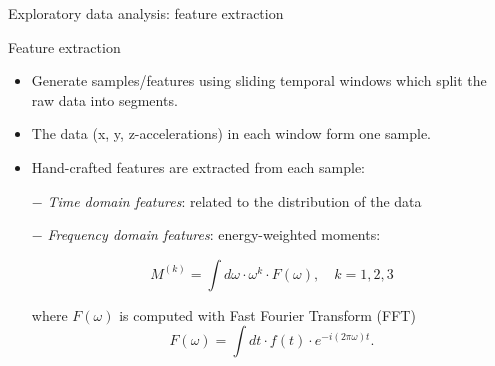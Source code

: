 \documentclass{if-beamer}
\begin{document}
\begin{frame}{Exploratory data analysis: feature extraction}


        \begin{block}{Feature extraction}
        
        \begin{itemize}
               \item  Generate samples/features using sliding temporal windows which split the raw data into segments. 
                
                \item The data (x, y, z-accelerations) in each window form one sample.  
         
             \item Hand-crafted features are extracted from each sample:
        \end{itemize}
        
        \begin{enumerate}
        		\item[$-$] \emph{Time domain features}: related to the distribution of the data
		
                                            
                                            
 		\item[$-$]  \emph{Frequency domain features}:  energy-weighted moments:
			  
                            \begin{equation}
                            		M^{(k)} = \int d\omega \cdot \omega^k \cdot F(\omega),\quad k=1, 2, 3
                            \end{equation}
                            
                             where $F(\omega)$ is computed with Fast Fourier Transform (FFT)
                              \begin{equation}
                              		F(\omega) = \int dt \cdot f(t) \cdot e^{-i(2\pi\omega) t}.
                                \end{equation}


               \end{enumerate}
   	 \end{block}
	 
\end{frame}
\end{document}
